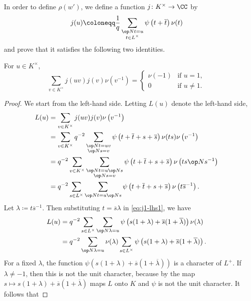 \documentclass[../main.tex]{subfiles}
\begin{document}
In order to define $\rho(w')$, we define a function $j\colon K^\times\to\CC$ by
\begin{equation}
	j(u)\coloneqq\frac1q\sum_{\substack{\op Nt=u\\t\in L^\times}}\psi\left(t+\overline t\right)\nu(t) \label{eq:def-cusp-j}
\end{equation}
and prove that it satisfies the following two identities.
\begin{lemma} \label{lem:j1}
	For $u\in K^\times$,
	\[\sum_{v\in K^\times}j(uv)j(v)\nu\left(v^{-1}\right)=\begin{cases}
		\nu(-1) & \text{if }u=1, \\
		0 & \text{if }u\ne1.
	\end{cases}\]
\end{lemma}
\begin{proof}
	We start from the left-hand side. Letting $L(u)$ denote the left-hand side,
	\begin{align}
		L(u) &= \sum_{v\in K^\times}j(uv)j(v)\nu\left(v^{-1}\right) \notag \\
		&= \sum_{v\in K^\times}q^{-2}\sum_{\substack{\op Nt=uv\\\op Ns=v}}\psi\left(t+\overline t+s+\overline s\right)\nu(ts)\nu\left(v^{-1}\right) \notag \\
		&= q^{-2}\sum_{v\in K^\times}\sum_{\substack{\op Nt=u\op Ns\\\op Ns=v}}\psi\left(t+\overline t+s+\overline s\right)\nu\left(ts\op Ns^{-1}\right) \notag \\
		&= q^{-2}\sum_{s\in L^\times}\sum_{\op Nt=u\op Ns}\psi\left(t+\overline t+s+\overline s\right)\nu\left(t\overline s^{-1}\right). \label{eq:j1-lhs1}
	\end{align}
	Let $\lambda\coloneqq t\overline s^{-1}$. Then substituting $t=\overline s\lambda$ in \eqref{eq:j1-lhs1}, we have
	\begin{align}
		L(u) &= q^{-2}\sum_{s\in L^\times}\sum_{\op N\lambda=u}\psi\left(s(1+\lambda)+\overline s(1+\overline\lambda)\right)\nu(\lambda) \notag \\
		&= q^{-2}\sum_{\op N\lambda=u}\nu(\lambda)\sum_{s\in L^\times}\psi\left(s(1+\lambda)+\overline s(1+\overline\lambda)\right). \label{eq:j1-lhs2}
	\end{align}
	For a fixed $\lambda$, the function $\psi\left(s(1+\lambda)+\overline s(1+\overline\lambda)\right)$ is a character of $L^+$. If $\lambda\ne-1$, then this is not the unit character, because by  the map $s\mapsto s(1+\lambda)+\overline s(1+\overline\lambda)$ maps $L$ onto $K$ and $\psi$ is not the unit character. It follows that

\end{proof}
\end{document}
